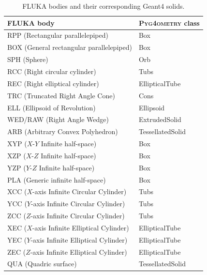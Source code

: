 \documentclass[final,5p,times,twocolumn]{elsarticle}
\newcommand{\PYGEOMETRY}{\textsc{Pyg4ometry}}
\begin{document}
\begin{table}[hbt!]
\caption{FLUKA bodies and their corresponding Geant4 solids.} \label{tab:Fluka2Geant4}
\centering
\begin{tabular}{ll} \hline
FLUKA body                                              & \PYGEOMETRY{} class \\ \hline
RPP (Rectangular parallelepiped)			& Box \\
BOX (General rectangular parallelepiped)		& Box \\
SPH (Sphere)    					& Orb \\
RCC (Right circular cylinder)				& Tubs \\
REC (Right elliptical cylinder)				& EllipticalTube \\
TRC (Truncated Right Angle Cone)			& Cons \\
ELL (Ellipsoid of Revolution) 				& Ellipsoid \\
WED/RAW (Right Angle Wedge)		        	& ExtrudedSolid \\
ARB	(Arbitrary Convex Polyhedron)			& TessellatedSolid \\
XYP 	($X$-$Y$ Infinite half-space)			& Box \\
XZP 	($X$-$Z$ Infinite half-space)			& Box \\
YZP 	($Y$-$Z$ Infinite half-space)			& Box \\
PLA (Generic infinite half-space)			& Box \\
XCC ($X$-axis Infinite Circular Cylinder)		& Tubs \\
YCC ($Y$-axis Infinite Circular Cylinder)		& Tubs \\
ZCC 	($Z$-axis Infinite Circular Cylinder)		& Tubs \\
XEC 	($X$-axis Infinite Elliptical Cylinder)		& EllipticalTube \\
YEC 	($Y$-axis Infinite Elliptical Cylinder)		& EllipticalTube \\
ZEC ($Z$-axis Infinite Elliptical Cylinder)		& EllipticalTube \\
QUA (Quadric surface) 					& TessellatedSolid \\ \hline
\end{tabular}
\end{table}
\end{document}
